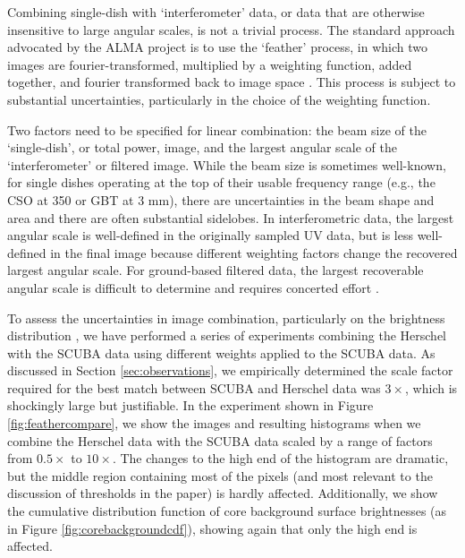 \documentclass[twocolumn]{aastex61}
\begin{document}
Combining single-dish with `interferometer' data, or data that are otherwise
insensitive to large angular scales, is not a trivial process.  The standard
approach advocated by the ALMA project is to use the `feather' process, in
which two images are fourier-transformed, multiplied by a weighting function,
added together, and fourier transformed back to image space \citep[see
equations in \S 5.2 of][]{Stanimirovic2002a}.  This process is subject to
substantial uncertainties, particularly in the choice of the weighting
function.  

Two factors need to be specified for linear combination: the beam size of the
`single-dish', or total power, image, and the largest angular scale of the
`interferometer' or filtered image.  While the beam size is sometimes
well-known, for single dishes operating at the top of their usable frequency
range (e.g., the CSO at 350 \um or GBT at 3 mm), there are uncertainties in the
beam shape and area and there are often substantial sidelobes.  In
interferometric data, the largest angular scale is well-defined in the
originally sampled UV data, but is less well-defined in the final image because
different weighting factors change the recovered largest angular scale.  For
ground-based filtered data, the largest recoverable angular scale is difficult
to determine and requires concerted effort
\citep[e.g.,][]{Ginsburg2013a,Chapin2013a}.

To assess the uncertainties in image combination, particularly on the
brightness distribution \citep[e.g.][]{Ossenkopf-Okada2016a}, we have performed
a series of experiments combining the Herschel with the SCUBA data using
different weights applied to the SCUBA data.  As discussed in Section
\ref{sec:observations}, we empirically determined the scale factor required for
the best match between SCUBA and Herschel data was $3\times$, which is
shockingly large but justifiable.  In the experiment shown in Figure
\ref{fig:feathercompare}, we show the images and resulting histograms when we
combine the Herschel data with the SCUBA data scaled by a range of factors from
$0.5\times$ to $10\times$.  The changes to the high end of the histogram are
dramatic, but the middle region containing most of the pixels (and most
relevant to the discussion of thresholds in the paper) is hardly affected.
Additionally, we show the cumulative distribution function of core background
surface brightnesses (as in Figure \ref{fig:corebackgroundcdf}), showing again
that only the high end is affected. 
\end{document}
